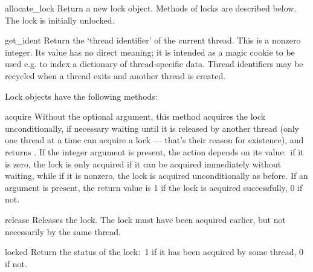\begin{funcdesc}{allocate_lock}{}
Return a new lock object.  Methods of locks are described below.  The
lock is initially unlocked.
\end{funcdesc}

\begin{funcdesc}{get_ident}{}
Return the `thread identifier' of the current thread.  This is a
nonzero integer.  Its value has no direct meaning; it is intended as a
magic cookie to be used e.g. to index a dictionary of thread-specific
data.  Thread identifiers may be recycled when a thread exits and
another thread is created.
\end{funcdesc}

Lock objects have the following methods:

\begin{funcdesc}{acquire}{}
Without the optional argument, this method acquires the lock
unconditionally, if necessary waiting until it is released by another
thread (only one thread at a time can acquire a lock --- that's their
reason for existence), and returns .  If the integer
 argument is present, the action depends on its value:\
if it is zero, the lock is only acquired if it can be acquired
immediately without waiting, while if it is nonzero, the lock is
acquired unconditionally as before.  If an argument is present, the
return value is 1 if the lock is acquired successfully, 0 if not.
\end{funcdesc}

\begin{funcdesc}{release}{}
Releases the lock.  The lock must have been acquired earlier, but not
necessarily by the same thread.
\end{funcdesc}

\begin{funcdesc}{locked}{}
Return the status of the lock:\ 1 if it has been acquired by some
thread, 0 if not.
\end{funcdesc}



